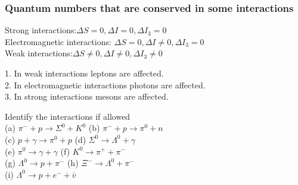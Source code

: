 \subsubsection{Quantum numbers that are conserved in some interactions}
Strong interactions:\hspace{3cm}$\Delta S=0, \Delta I=0, \Delta I_3=0$\\
Electromagnetic interactions:\hspace{1.3cm} $\Delta S=0, \Delta I \neq 0, \Delta I_3=0$\\
Weak interactions:\hspace{3.1cm}$\Delta S \neq 0, \Delta I \neq 0, \Delta I_3 \neq 0$
\begin{note}
	1. In weak interactions leptons are affected.\\
	2. In electromagnetic interactions photons are affected.\\
	3. In strong interactions mesons are affected.\\
\end{note}
\begin{exercise}
Identify the interactions if allowed\\
	(a) $\pi^{-}+p \rightarrow \Sigma^0+K^0$\hspace{2cm}
	(b) $\pi^{-}+p \rightarrow \pi^0+n$\\
	(c) $p+\gamma \rightarrow \pi^0+p$\hspace{2.5cm}
	(d) $\Sigma^0 \rightarrow \Lambda^0+\gamma$\\
	(e) $\pi^0 \rightarrow \gamma+\gamma$\hspace{3.2cm}
	(f) $K^0 \rightarrow \pi^{+}+\pi^{-}$\\
	(g) $\Lambda^0 \rightarrow p+\pi^{-}$\hspace{2.8cm}
	(h) $\Xi^{-} \rightarrow \Lambda^0+\pi^{-}$\\
	(i) $\Lambda^0 \rightarrow p+e^{-}+\bar{v}$
\end{exercise}
